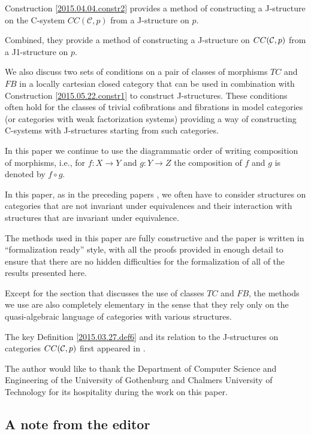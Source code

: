 \documentclass[12pt]{article}
\numberwithin{equation}{section}
\newcommand{\sr}{\rightarrow}
\newcommand{\toCC}{CC} %
\newcommand{\C}{{\mathcal C}}  %
\begin{document}
Construction \ref{2015.04.04.constr2} provides a method of constructing a
J-structure on the C-system $\toCC({\C},p)$ from a J-structure on $p$.

Combined, they provide a method of constructing a J-structure on
$\toCC({\cal C},p)$ from a J1-structure on $p$.

We also discuss two sets of conditions on a pair of classes of morphisms $TC$
and $FB$ in a locally cartesian closed category that can be used in combination
with Construction \ref{2015.05.22.constr1} to construct J-structures. These
conditions often hold for the classes of trivial cofibrations and fibrations in
model categories (or categories with weak factorization systems) providing a
way of constructing C-systems with J-structures starting from such categories.

In this paper we continue to use the diagrammatic order of writing composition
of morphisms, i.e., for $f:X\sr Y$ and $g:Y\sr Z$ the composition of $f$ and
$g$ is denoted by $f\circ g$.

In this paper, as in the preceding papers \cite{Cfromauniverse,fromunivwithPiI,presheavesOb,fromunivwithPiII},
we often have to consider structures on categories that
are not invariant under equivalences and their interaction with structures that
are invariant under equivalence.

The methods used in this paper are fully constructive and the paper is written
in ``formalization ready'' style, with all the proofs provided in enough detail
to ensure that there are no hidden difficulties for the formalization of all of
the results presented here.

Except for the section that discusses the use of classes $TC$ and $FB$, the
methods we use are also completely elementary in the sense that they rely only
on the quasi-algebraic language of categories with various structures.

The key Definition \ref{2015.03.27.def6} and its relation to the J-structures
on categories $\toCC({\cal C},p)$ first appeared in \cite{CMUtalk}.

The author would like to thank the Department of Computer Science and
Engineering of the University of Gothenburg and Chalmers University of
Technology for its hospitality during the work on this paper.


\subsection{A note from the editor}
\end{document}

